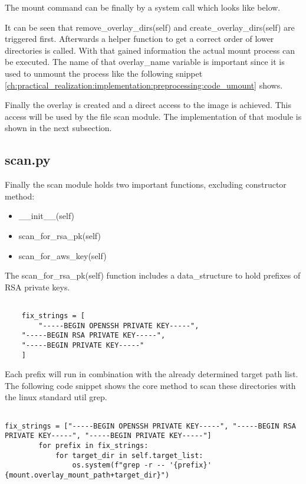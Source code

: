 The mount command can be finally by a system call which looks like below.

It can be seen that remove\_overlay\_dirs(self) and create\_overlay\_dirs(self) are triggered first. Afterwards a helper function to get a correct order of lower directories is called. With that gained information the actual mount process can be executed. The name of that overlay\_name variable is important since it is used to unmount the process like the following snippet \ref{ch:practical_realization:implementation:preprocessing:code_umount} shows.


Finally the overlay is created and a direct access to the image is achieved. This access will be used by the file scan module. The implementation of that module is shown in the next subsection.

\subsection{scan.py}
\label{ch:practical_realization:implementation:scan}
Finally the scan module holds two important functions, excluding constructor method:
\begin{itemize}
\item \_\_init\_\_(self)
\item scan\_for\_rsa\_pk(self)
\item scan\_for\_aws\_key(self)
\end{itemize}

The scan\_for\_rsa\_pk(self) function includes a data\_structure to hold prefixes of RSA private keys.
\lstset{language=Python}          %
\begin{lstlisting}[]  % Start your code-block
	
    fix_strings = [
    	"-----BEGIN OPENSSH PRIVATE KEY-----",
	"-----BEGIN RSA PRIVATE KEY-----",
	"-----BEGIN PRIVATE KEY-----"
	]
\end{lstlisting}
Each prefix will run in combination with the already determined target path list.
The following code snippet shows the core method to scan these directories with the linux standard util grep.
\lstset{language=Python}          %
\begin{lstlisting}[]  % Start your code-block
	
fix_strings = ["-----BEGIN OPENSSH PRIVATE KEY-----", "-----BEGIN RSA PRIVATE KEY-----", "-----BEGIN PRIVATE KEY-----"]
        for prefix in fix_strings:
            for target_dir in self.target_list:
                os.system(f"grep -r -- '{prefix}' {mount.overlay_mount_path+target_dir}")

\end{lstlisting}

